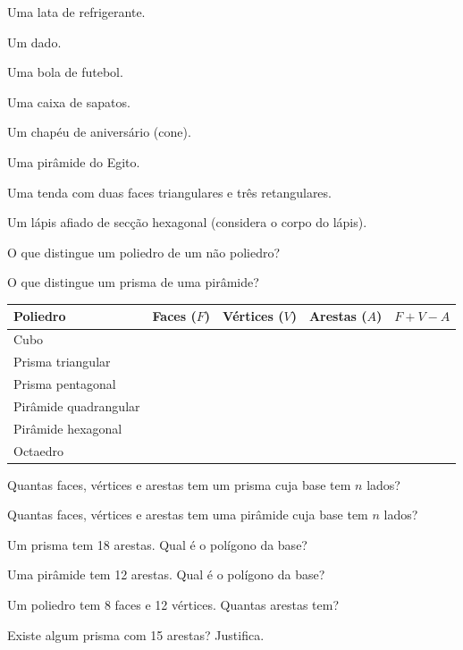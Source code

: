 \documentclass[12pt]{article}
\begin{document}


\begin{exercicios}
  \item Uma lata de refrigerante.
  \item Um dado.
  \item Uma bola de futebol.
  \item Uma caixa de sapatos.
  \item Um chapéu de aniversário (cone).
  \item Uma pirâmide do Egito.
  \item Uma tenda com duas faces triangulares e três retangulares.
  \item Um lápis afiado de secção hexagonal (considera o corpo do lápis).
  \item O que distingue um poliedro de um não poliedro?
  \item O que distingue um prisma de uma pirâmide?
\end{exercicios}


\begin{center}
\begin{tabular}{|l|c|c|c|c|}\hline
  Poliedro & Faces ($F$) & Vértices ($V$) & Arestas ($A$) & $F + V - A$ \\\hline
  Cubo & & & & \\\hline
  Prisma triangular & & & & \\\hline
  Prisma pentagonal & & & & \\\hline
  Pirâmide quadrangular & & & & \\\hline
  Pirâmide hexagonal & & & & \\\hline
  Octaedro & & & & \\\hline
\end{tabular}
\end{center}

\begin{exercicios}
  \item Quantas faces, vértices e arestas tem um prisma cuja base tem $n$ lados?
  \item Quantas faces, vértices e arestas tem uma pirâmide cuja base tem $n$ lados?
  \item Um prisma tem 18 arestas. Qual é o polígono da base?
  \item Uma pirâmide tem 12 arestas. Qual é o polígono da base?
  \item Um poliedro tem 8 faces e 12 vértices. Quantas arestas tem?
  \item Existe algum prisma com 15 arestas? Justifica.
\end{exercicios}
\end{document}
